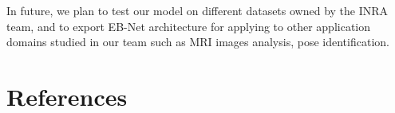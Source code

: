 \documentclass[review]{elsarticle}
\begin{document}
In future, we plan to test our model on different datasets owned by the INRA team, and to export EB-Net architecture for applying to other application domains studied in our team such as MRI images analysis, pose identification.





\section*{References}


\end{document}
